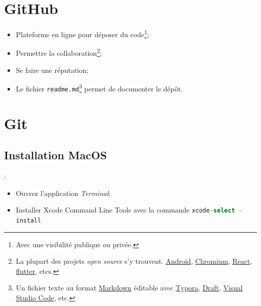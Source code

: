 \documentclass[10pt]{beamer}
\begin{document}
\section{GitHub}
\begin{frame}{\secname}
    \begin{itemize}
        \item Plateforme en ligne pour déposer du code\footnote{Avec une visibilité publique ou privée.};
        \item Permettre la collaboration\footnote{La plupart des projets \emph{open source} s’y trouvent. \href{https://github.com/android}{Android}, \href{https://github.com/chromium/chromium}{Chromium}, \href{https://github.com/facebook/react}{React}, \href{https://github.com/flutter/flutter}{flutter}, etcs.};
        \item Se faire une réputation;
        \item Le fichier \lstinline[language=git]!readme.md!\footnote{Un fichier texte au format \href{https://fr.wikipedia.org/wiki/Markdown}{Markdown} éditable avec \href{https://typora.io}{Typora}, \href{https://draftin.com}{Draft}, \href{https://code.visualstudio.com}{Visual Studio Code}, etc.} permet de documenter le dépôt.
    \end{itemize}
\end{frame}

\section{Git}
\subsection{Installation MacOS}

\begin{frame}{\secname : \subsecname}
    \begin{itemize}
        \item Ouvrez l'application \emph{Terminal};
        \item Installer Xcode Command Line Tools avec la commande \lstinline[language=sql]!xcode-select -install!
    \end{itemize}
\end{frame}
\end{document}
